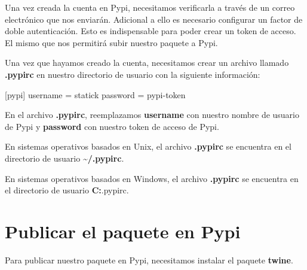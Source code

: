 \documentclass[
  a4paper,
  DIV=11,
  numbers=noendperiod,
  onepage,
  openany]{scrreprt}
\newenvironment{Shaded}{\begin{snugshade}}{\end{snugshade}}
\newcommand{\NormalTok}[1]{\textcolor[rgb]{0.00,0.23,0.31}{#1}}
\begin{document}
\begin{tcolorbox}
\begin{tcolorbox}
Una vez creada la cuenta en Pypi, necesitamos verificarla a través de un
correo electrónico que nos enviarán. Adicional a ello es necesario
configurar un factor de doble autenticación. Esto es indispensable para
poder crear un token de acceso. El mismo que nos permitirá subir nuestro
paquete a Pypi.

\end{tcolorbox}

Una vez que hayamos creado la cuenta, necesitamos crear un archivo
llamado \textbf{.pypirc} en nuestro directorio de usuario con la
siguiente información:

\begin{Shaded}
\begin{Highlighting}[]
\NormalTok{[pypi]}
\NormalTok{  username = statick}
\NormalTok{  password = pypi{-}token}
\end{Highlighting}
\end{Shaded}

En el archivo \textbf{.pypirc}, reemplazamos \textbf{username} con
nuestro nombre de usuario de Pypi y \textbf{password} con nuestro token
de acceso de Pypi.

\begin{tcolorbox}[enhanced jigsaw, coltitle=black, colframe=quarto-callout-tip-color-frame, opacityback=0, breakable, colbacktitle=quarto-callout-tip-color!10!white, title=\textcolor{quarto-callout-tip-color}{\faLightbulb}\hspace{0.5em}{Tip}, left=2mm, leftrule=.75mm, titlerule=0mm, colback=white, arc=.35mm, toptitle=1mm, opacitybacktitle=0.6, bottomtitle=1mm, bottomrule=.15mm, rightrule=.15mm, toprule=.15mm]

En sistemas operativos basados en Unix, el archivo \textbf{.pypirc} se
encuentra en el directorio de usuario \textbf{\textasciitilde/.pypirc}.

En sistemas operativos basados en Windows, el archivo \textbf{.pypirc}
se encuentra en el directorio de usuario
\textbf{C:}\Users\username.pypirc.

\end{tcolorbox}

\chapter{Publicar el paquete en Pypi}\label{publicar-el-paquete-en-pypi}

Para publicar nuestro paquete en Pypi, necesitamos instalar el paquete
\textbf{twine}.


\end{tcolorbox}
\end{document}
